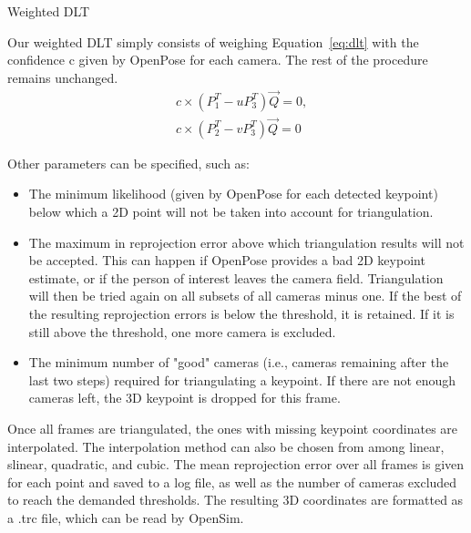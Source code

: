 \begin{algorithm}[!ht]
      \caption{Weighted DLT}\label{alg:weighted_dlt}
      \begin{algorithmic}[1]
            \STATEx Our weighted DLT simply consists of weighing Equation~\ref{eq:dlt} with the confidence c given by OpenPose for each camera. The rest of the procedure remains unchanged.
            \begin{equation}
                  \begin{aligned}
                  & c \times (P_1^T - u P_3^T) \overrightarrow{Q}=0,\\
                  & c \times (P_2^T - v P_3^T) \overrightarrow{Q}=0
                  \end{aligned}
          \end{equation}
      \end{algorithmic}
\end{algorithm}

Other parameters can be specified, such as:
\begin{itemize}[itemsep=0em, topsep=0em, leftmargin=*]
      \item The minimum likelihood (given by OpenPose for each detected keypoint) below which a 2D point will not be taken into account for triangulation.
      \item The maximum in reprojection error above which triangulation results will not be accepted. This can happen if OpenPose provides a bad 2D keypoint estimate, or if the person of interest leaves the camera field. Triangulation will then be tried again on all subsets of all cameras minus one. If the best of the resulting reprojection errors is below the threshold, it is retained. If it is still above the threshold, one more camera is excluded.
      \item The minimum number of "good" cameras (i.e., cameras remaining after the last two steps) required for triangulating a keypoint. If there are not enough cameras left, the 3D keypoint is dropped for this frame.
\end{itemize}

Once all frames are triangulated, the ones with missing keypoint coordinates are interpolated. The interpolation method can also be chosen from among linear, slinear, quadratic, and cubic. The mean reprojection error over all frames is given for each point and saved to a log file, as well as the number of cameras excluded to reach the demanded thresholds. The resulting 3D coordinates are formatted as a .trc file, which can be read by OpenSim.


